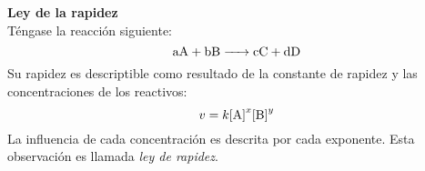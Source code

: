\documentclass[../main]{subfiles}
\begin{document}
\textbf{Ley de la rapidez}\\
Téngase la reacción siguiente:
\begin{equation*}
  \ce{aA + bB -> cC + dD}
\end{equation*}
Su rapidez es descriptible como resultado de la constante de rapidez y las concentraciones de los reactivos:
\begin{equation*}
  v = k \ce{[A]}^{x} \ce{[B]}^{y}
\end{equation*}
La influencia de cada concentración es descrita por cada exponente.
Esta observación es llamada \textit{ley de rapidez}. \parencite{book:chang2013}
\end{document}
